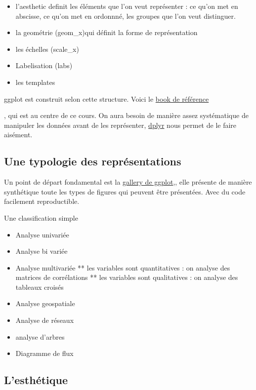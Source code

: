 \documentclass[
]{book}
\providecommand{\tightlist}{%
  \setlength{\itemsep}{0pt}\setlength{\parskip}{0pt}}
\begin{document}
\begin{itemize}
\tightlist
\item
  l'aesthetic definit les éléments que l'on veut représenter : ce qu'on met en abscisse, ce qu'on met en ordonnné, les groupes que l'on veut distinguer.
\item
  la geométrie (geom\_x)qui définit la forme de représentation
\item
  les échelles (scale\_x)
\item
  Labelisation (labs)
\item
  les templates
\end{itemize}

ggplot est construit selon cette structure. Voici le \href{https://ggplot2-book.org/}{book de référence}

, qui est au centre de ce cours. On aura besoin de manière assez systématique de manipuler les données avant de les représenter, \href{http://larmarange.github.io/analyse-R/manipuler-les-donnees-avec-dplyr.html}{dplyr} nous permet de le faire aisément.

\hypertarget{une-typologie-des-repruxe9sentations}{%
\subsection{Une typologie des représentations}\label{une-typologie-des-repruxe9sentations}}

Un point de départ fondamental est la \href{https://www.r-graph-gallery.com/}{gallery de ggplot},, elle présente de manière synthétique toute les types de figures qui peuvent être présentées. Avec du code facilement reproductible.

Une classification simple

\begin{itemize}
\tightlist
\item
  Analyse univariée
\item
  Analyse bi variée
\item
  Analyse multivariée
  ** les variables sont quantitatives : on analyse des matrices de corrélations
  ** les variables sont qualitatives : on analyse des tableaux croisés
\item
  Analyse geospatiale
\item
  Analyse de réseaux
\item
  analyse d'arbres
\item
  Diagramme de flux
\end{itemize}

\hypertarget{lesthuxe9tique}{%
\subsection{L'esthétique}\label{lesthuxe9tique}}
\end{document}

